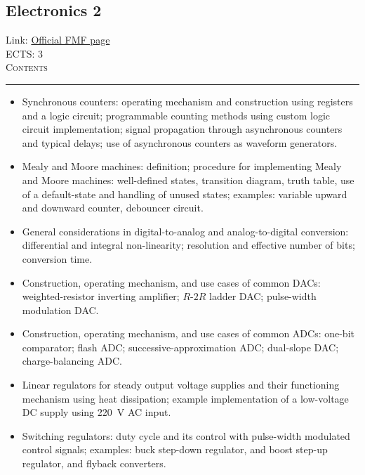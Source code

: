 \documentclass[11pt, a4paper]{article}
\newenvironment{course}[3]{
\subsection{#1}%
Link: \href{#2}{Official FMF page}\\%
ECTS: #3%
\vspace{1ex}
\\
{\large \textsc{Contents}}\\[-0.9ex]%
\rule{\textwidth}{0.5pt}
\vspace{-3ex}
}
{}
\newenvironment{chapter}[1]{
\begin{tcolorbox}[title=#1, breakable]
}
{\end{tcolorbox}}
\begin{document}
\begin{course}{Electronics 2}{https://www.fmf.uni-lj.si/en/study-physics/programmes/1fiz/2020/7000777/courses/1135/}{3}
\begin{chapter}{Counters and finite-state machines}
\begin{itemize}
            \item Synchronous counters: operating mechanism and construction using registers and a logic circuit; programmable counting methods using custom logic circuit implementation; signal propagation through asynchronous counters and typical delays; use of asynchronous counters as waveform generators.

            \item Mealy and Moore machines: definition; procedure for implementing Mealy and Moore machines: well-defined states, transition diagram, truth table, use of a default-state and handling of unused states; examples: variable upward and downward counter, debouncer circuit.
        
        \end{itemize}
    \end{chapter}

    \begin{chapter}{Analog-digital conversion}
        \begin{itemize}
        
            \item General considerations in digital-to-analog and analog-to-digital conversion: differential and integral non-linearity; resolution and effective number of bits; conversion time.

            \item Construction, operating mechanism, and use cases of common DACs: weighted-resistor inverting amplifier; $ R $-$ 2R $ ladder DAC; pulse-width modulation DAC.

            \item Construction, operating mechanism, and use cases of common ADCs: one-bit comparator; flash ADC; successive-approximation ADC; dual-slope DAC; charge-balancing ADC.

        \end{itemize}
    \end{chapter}

    \begin{chapter}{Fundamentals of electronic regulation}
        \begin{itemize}
        
            \item Linear regulators for steady output voltage supplies and their functioning mechanism using heat dissipation; example implementation of a low-voltage DC supply using \SI{220}{\volt} AC input.

            \item Switching regulators: duty cycle and its control with pulse-width modulated control signals; examples: buck step-down regulator, and boost step-up regulator, and flyback converters.


\end{itemize}
\end{chapter}
\end{course}
\end{document}
